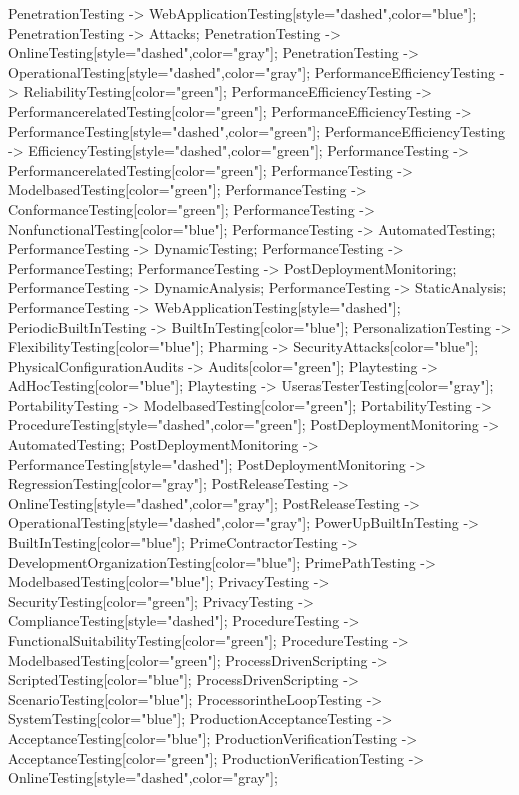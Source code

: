 \documentclass{article}
\begin{document}
{PenetrationTesting -> WebApplicationTesting[style="dashed",color="blue"];
PenetrationTesting -> Attacks;
PenetrationTesting -> OnlineTesting[style="dashed",color="gray"];
PenetrationTesting -> OperationalTesting[style="dashed",color="gray"];
PerformanceEfficiencyTesting -> ReliabilityTesting[color="green"];
PerformanceEfficiencyTesting -> PerformancerelatedTesting[color="green"];
PerformanceEfficiencyTesting -> PerformanceTesting[style="dashed",color="green"];
PerformanceEfficiencyTesting -> EfficiencyTesting[style="dashed",color="green"];
PerformanceTesting -> PerformancerelatedTesting[color="green"];
PerformanceTesting -> ModelbasedTesting[color="green"];
PerformanceTesting -> ConformanceTesting[color="green"];
PerformanceTesting -> NonfunctionalTesting[color="blue"];
PerformanceTesting -> AutomatedTesting;
PerformanceTesting -> DynamicTesting;
PerformanceTesting -> PerformanceTesting;
PerformanceTesting -> PostDeploymentMonitoring;
PerformanceTesting -> DynamicAnalysis;
PerformanceTesting -> StaticAnalysis;
PerformanceTesting -> WebApplicationTesting[style="dashed"];
PeriodicBuiltInTesting -> BuiltInTesting[color="blue"];
PersonalizationTesting -> FlexibilityTesting[color="blue"];
Pharming -> SecurityAttacks[color="blue"];
PhysicalConfigurationAudits -> Audits[color="green"];
Playtesting -> AdHocTesting[color="blue"];
Playtesting -> UserasTesterTesting[color="gray"];
PortabilityTesting -> ModelbasedTesting[color="green"];
PortabilityTesting -> ProcedureTesting[style="dashed",color="green"];
PostDeploymentMonitoring -> AutomatedTesting;
PostDeploymentMonitoring -> PerformanceTesting[style="dashed"];
PostDeploymentMonitoring -> RegressionTesting[color="gray"];
PostReleaseTesting -> OnlineTesting[style="dashed",color="gray"];
PostReleaseTesting -> OperationalTesting[style="dashed",color="gray"];
PowerUpBuiltInTesting -> BuiltInTesting[color="blue"];
PrimeContractorTesting -> DevelopmentOrganizationTesting[color="blue"];
PrimePathTesting -> ModelbasedTesting[color="blue"];
PrivacyTesting -> SecurityTesting[color="green"];
PrivacyTesting -> ComplianceTesting[style="dashed"];
ProcedureTesting -> FunctionalSuitabilityTesting[color="green"];
ProcedureTesting -> ModelbasedTesting[color="green"];
ProcessDrivenScripting -> ScriptedTesting[color="blue"];
ProcessDrivenScripting -> ScenarioTesting[color="blue"];
ProcessorintheLoopTesting -> SystemTesting[color="blue"];
ProductionAcceptanceTesting -> AcceptanceTesting[color="blue"];
ProductionVerificationTesting -> AcceptanceTesting[color="green"];
ProductionVerificationTesting -> OnlineTesting[style="dashed",color="gray"];
}
\end{document}
